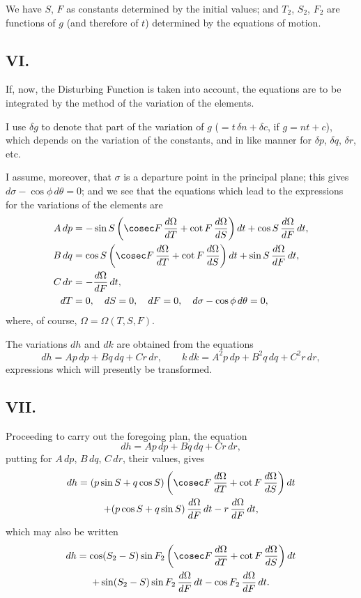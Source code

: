 \documentclass[11pt,a4paper]{book}
\begin{document}
We have $S$, $F$ as constants determined by the initial values; and $T_2$, $S_2$, $F_2$ are functions of $g$ (and therefore of $t$) determined by the equations of motion.

\subsection*{VI.}

If, now, the Disturbing Function is taken into account, the equations are to be integrated by the method of the variation of the elements.

I use $\delta g$ to denote that part of the variation of $g$ ($= t\,\delta n + \delta c$, if $g = nt + c$), which depends on the variation of the constants, and in like manner for $\delta p$, $\delta q$, $\delta r$, etc.

I assume, moreover, that $\sigma$ is a departure point in the principal plane; this gives $d\sigma - \cos\phi\,d\theta = 0$; and we see that the equations which lead to the expressions for the variations of the elements are
\begin{align*}
A\,dp &= -\sin S\left(\cosec F\,\frac{d\Omega}{dT} + \cot F\,\frac{d\Omega}{dS}\right)dt + \cos S\,\frac{d\Omega}{dF}\,dt, \\
B\,dq &= \cos S\left(\cosec F\,\frac{d\Omega}{dT} + \cot F\,\frac{d\Omega}{dS}\right)dt + \sin S\,\frac{d\Omega}{dF}\,dt, \\
C\,dr &= -\frac{d\Omega}{dF}\,dt, \\
dT &= 0, \quad dS = 0, \quad dF = 0, \quad d\sigma - \cos\phi\,d\theta = 0,
\end{align*}
where, of course, $\Omega = \Omega(T, S, F)$.

The variations $dh$ and $dk$ are obtained from the equations
\[
dh = Ap\,dp + Bq\,dq + Cr\,dr, \qquad k\,dk = A^2p\,dp + B^2q\,dq + C^2r\,dr,
\]
expressions which will presently be transformed.

\subsection*{VII.}

Proceeding to carry out the foregoing plan, the equation
\[
dh = Ap\,dp + Bq\,dq + Cr\,dr,
\]
putting for $A\,dp$, $B\,dq$, $C\,dr$, their values, gives
\begin{multline}
dh = (p\sin S + q\cos S)\left(\cosec F\,\frac{d\Omega}{dT} + \cot F\,\frac{d\Omega}{dS}\right)dt \\
+ (p\cos S + q\sin S)\,\frac{d\Omega}{dF}\,dt - r\,\frac{d\Omega}{dF}\,dt,
\end{multline}
which may also be written
\begin{multline}
dh = \cos(S_2-S)\sin F_2\left(\cosec F\,\frac{d\Omega}{dT} + \cot F\,\frac{d\Omega}{dS}\right)dt \\
+ \sin(S_2-S)\sin F_2\,\frac{d\Omega}{dF}\,dt - \cos F_2\,\frac{d\Omega}{dF}\,dt.
\end{multline}
\end{document}
